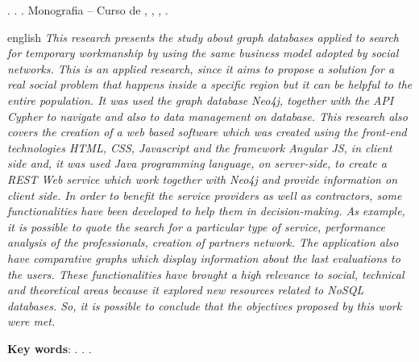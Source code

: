 
\begin{OnehalfSpacing} 

\noindent \imprimirAutorCitacaoMaiuscula. {\bfseries\imprimirtitulo}. {\imprimirdata}.  Monografia -- Curso de {\MakeUppercase\imprimircurso}, {\imprimirinstituicao}, {\imprimirlocal}, {\imprimirdata}.

\vspace{\onelineskip}
\vspace{\onelineskip}
\vspace{\onelineskip}
\vspace{\onelineskip}

\begin{resumo}[Abstract]%
\begin{otherlanguage*}{english}%
\textit{
\noindent This research presents the study about graph databases applied to search for temporary workmanship by using the same business model adopted by social networks. This is an applied research, since it aims to propose a solution for a real social problem that happens inside a specific region but it can be helpful to the entire population. It was used the graph database Neo4j, together with the API Cypher to navigate and also to data management on database. This research also covers the creation of a web based software which was created using the front-end technologies HTML, CSS, Javascript and the framework Angular JS, in client side and, it was used Java programming language, on server-side, to create a REST Web service which work together with Neo4j and provide information on client side. In order to benefit the service providers as well as contractors, some functionalities have been developed to help them in decision-making. As example, it is possible to quote the search for a particular type of service, performance analysis of the professionals, creation of partners network. The application also have comparative graphs which display information about the last evaluations to the users. These functionalities have brought a high relevance to social, technical and theoretical areas because it explored new resources related to NoSQL databases. So, it is possible to conclude that the objectives proposed by this work were met.
}

\vspace{\onelineskip}
\vspace*{\fill}
\noindent \textbf{Key words}: \imprimirKeyWordOne. \imprimirKeyWordTwo. \imprimirKeyWordThree.
\end{otherlanguage*}
\vspace{\onelineskip}
\end{resumo}

\end{OnehalfSpacing}
